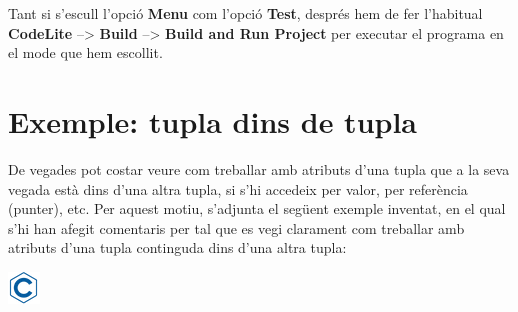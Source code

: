 \documentclass[]{book}
\begin{document}
Tant si s'escull l'opció \textbf{Menu} com l'opció \textbf{Test},
després hem de fer l'habitual \textbf{CodeLite} --\textgreater{}
\textbf{Build} --\textgreater{} \textbf{Build and Run Project} per
executar el programa en el mode que hem escollit.

\section{Exemple: tupla dins de
tupla}\label{exemple-tupla-dins-de-tupla}

De vegades pot costar veure com treballar amb atributs d'una tupla que a
la seva vegada està dins d'una altra tupla, si s'hi accedeix per valor,
per referència (punter), etc. Per aquest motiu, s'adjunta el següent
exemple inventat, en el qual s'hi han afegit comentaris per tal que es
vegi clarament com treballar amb atributs d'una tupla continguda dins
d'una altra tupla:

\includegraphics{./img/c.png}
\end{document}
